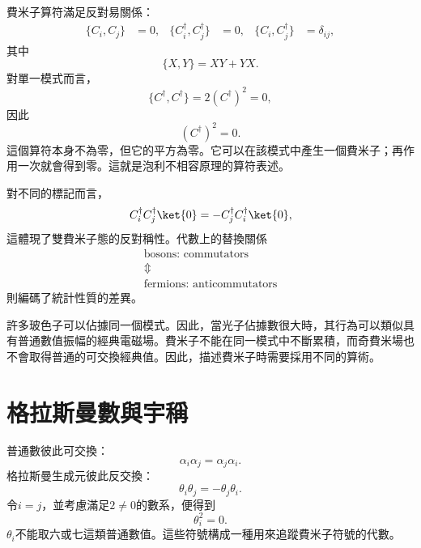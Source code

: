 費米子算符滿足反對易關係：
\begin{align}
\{C_i,C_j\}&=0,&
\{C_i^\dagger,C_j^\dagger\}&=0,&
\{C_i,C_j^\dagger\}&=\delta_{ij},
\end{align}
其中
\begin{equation}
\{X,Y\}=XY+YX.
\end{equation}
對單一模式而言，
\begin{equation}
\{C^\dagger,C^\dagger\}=2(C^\dagger)^2=0,
\end{equation}
因此
\begin{equation}
(C^\dagger)^2=0.
\end{equation}
這個算符本身不為零，但它的平方為零。它可以在該模式中產生一個費米子；再作用一次就會得到零。這就是泡利不相容原理的算符表述。

對不同的標記而言，
\begin{equation}
C_i^\dagger C_j^\dagger\ket{0}
=-C_j^\dagger C_i^\dagger\ket{0},
\end{equation}
這體現了雙費米子態的反對稱性。代數上的替換關係
\begin{equation}
\begin{gathered}
\text{bosons: commutators}\\
\Updownarrow\\
\text{fermions: anticommutators}
\end{gathered}
\end{equation}
則編碼了統計性質的差異。

許多玻色子可以佔據同一個模式。因此，當光子佔據數很大時，其行為可以類似具有普通數值振幅的經典電磁場。費米子不能在同一模式中不斷累積，而奇費米場也不會取得普通的可交換經典值。因此，描述費米子時需要採用不同的算術。

\section{格拉斯曼數與宇稱}

普通數彼此可交換：
\begin{equation}
\alpha_i\alpha_j=\alpha_j\alpha_i.
\end{equation}
格拉斯曼生成元彼此反交換：
\begin{equation}
\theta_i\theta_j=-\theta_j\theta_i.
\end{equation}
令\(i=j\)，並考慮滿足\(2\neq0\)的數系，便得到
\begin{equation}
\theta_i^2=0.
\end{equation}
\(\theta_i\)不能取六或七這類普通數值。這些符號構成一種用來追蹤費米子符號的代數。

